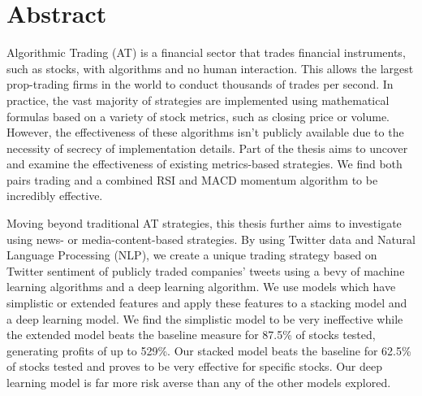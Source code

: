 \documentclass[../thesis.tex]{subfiles}
\begin{document}
\chapter*{Abstract}

Algorithmic Trading (AT) is a financial sector that trades financial instruments, such as stocks, with algorithms and no human interaction. This allows the largest prop-trading firms in the world to conduct thousands of trades per second. In practice, the vast majority of strategies are implemented using mathematical formulas based on a variety of stock metrics, such as closing price or volume. However, the effectiveness of these algorithms isn't publicly available due to the necessity of secrecy of implementation details. Part of the thesis aims to uncover and examine the effectiveness of existing metrics-based strategies. We find both pairs trading and a combined RSI and MACD momentum algorithm to be incredibly effective.

Moving beyond traditional AT strategies, this thesis further aims to investigate using news- or media-content-based strategies. By using Twitter data and Natural Language Processing (NLP), we create a unique trading strategy based on Twitter sentiment of publicly traded companies' tweets using a bevy of machine learning algorithms and a deep learning algorithm. We use models which have simplistic or extended features and apply these features to a stacking model and a deep learning model. We find the simplistic model to be very ineffective while the extended model beats the baseline measure for 87.5\% of stocks tested, generating profits of up to 529\%. Our stacked model beats the baseline for 62.5\% of stocks tested and proves to be very effective for specific stocks. Our deep learning model is far more risk averse than any of the other models explored.
\end{document}
